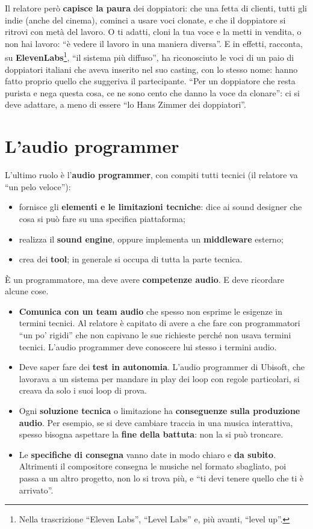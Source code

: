 Il relatore però \textbf{capisce la paura} dei doppiatori: che una fetta di
clienti, tutti gli indie (anche del cinema), cominci a usare voci clonate, e che
il doppiatore si ritrovi con metà del lavoro. O ti adatti, cloni la tua voce e la
metti in vendita, o non hai lavoro: ``è vedere il lavoro in una maniera
diversa''. E in effetti, racconta, su \textbf{ElevenLabs}\footnote{Nella
trascrizione ``Eleven Labs'', ``Level Labs'' e, più avanti, ``level up''.},
``il sistema più diffuso'', ha riconosciuto le voci di un paio di doppiatori
italiani che aveva inserito nel suo casting, con lo stesso nome: hanno fatto
proprio quello che suggeriva il partecipante. ``Per un doppiatore che resta
purista e nega questa cosa, ce ne sono cento che danno la voce da clonare'': ci si
deve adattare, a meno di essere ``lo Hans Zimmer dei doppiatori''.

\section{L'audio programmer}
\label{z9:sec:programmer}

L'ultimo ruolo è l'\textbf{audio programmer}, con compiti tutti tecnici (il
relatore va ``un pelo veloce''):
\begin{itemize}
  \item fornisce gli \textbf{elementi e le limitazioni tecniche}: dice ai sound
        designer che cosa si può fare su una specifica piattaforma;
  \item realizza il \textbf{sound engine}, oppure implementa un
        \textbf{middleware} esterno;
  \item crea dei \textbf{tool}; in generale si occupa di tutta la parte tecnica.
\end{itemize}
È un programmatore, ma deve avere \textbf{competenze audio}. E deve ricordare
alcune cose.
\begin{itemize}
  \item \textbf{Comunica con un team audio} che spesso non esprime le esigenze
        in termini tecnici. Al relatore è capitato di avere a che fare con
        programmatori ``un po' rigidi'' che non capivano le sue richieste perché
        non usava termini tecnici. L'audio programmer deve conoscere lui stesso
        i termini audio.
  \item Deve saper fare dei \textbf{test in autonomia}. L'audio programmer di
        Ubisoft, che lavorava a un sistema per mandare in play dei loop con
        regole particolari, si creava da solo i suoi loop di prova.
  \item Ogni \textbf{soluzione tecnica} o limitazione ha \textbf{conseguenze
        sulla produzione audio}. Per esempio, se si deve cambiare traccia in una
        musica interattiva, spesso bisogna aspettare la \textbf{fine della
        battuta}: non la si può troncare.
  \item Le \textbf{specifiche di consegna} vanno date in modo chiaro e
        \textbf{da subito}. Altrimenti il compositore consegna le musiche nel
        formato sbagliato, poi passa a un altro progetto, non lo si trova più,
        e ``ti devi tenere quello che ti è arrivato''.
\end{itemize}


